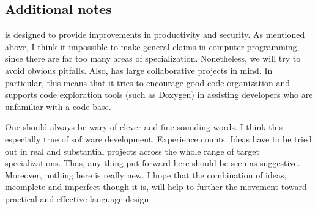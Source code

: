 \documentclass[10pt]{amsart}
\begin{document}


\subsection{Additional notes}

\Utop is designed to provide improvements in productivity and
security.  As mentioned above, I think it impossible to make general
claims in computer programming, since there are far too many areas of
specialization.  Nonetheless, we will try to avoid obvious pitfalls.
Also, \Utop has large collaborative projects in mind.  In particular,
this means that it tries to encourage good code organization and
supports code exploration tools (such as Doxygen) in assisting
developers who are unfamiliar with a code base.

One should always be wary of clever and fine-sounding words.  I think
this especially true of software development.  Experience counts.
Ideas have to be tried out in real and substantial projects across the
whole range of target specializations.  Thus, any thing put forward
here should be seen as suggestive.  Moreover, nothing here is really
new.  I hope that the combination of ideas, incomplete and imperfect
though it is, will help to further the movement toward practical and
effective language design.
\end{document}
